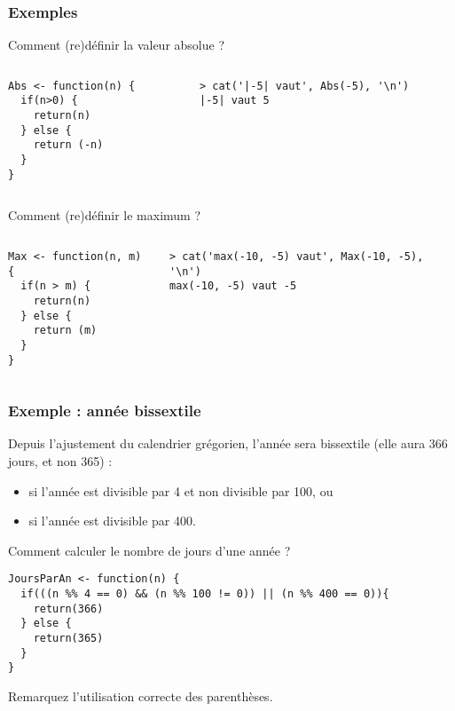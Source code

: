 \documentclass[10pt]{beamer}
\begin{document}
\begin{frame}[fragile]
  \frametitle{Exemples}

  \begin{exampleblock}{Comment (re)définir la valeur absolue ?}
\begin{columns}[c]
\begin{column}{0.4\textwidth}
  \begin{lstlisting}[style=edblock]
Abs <- function(n) {
  if(n>0) {
    return(n)
  } else {
    return (-n)
  }
}
\end{lstlisting}
\end{column}
\begin{column}{0.6\textwidth}
  \begin{lstlisting}
> cat('|-5| vaut', Abs(-5), '\n')
|-5| vaut 5    
  \end{lstlisting}
\end{column}
\end{columns}
\end{exampleblock}

  \begin{exampleblock}{Comment (re)définir le maximum ?}
\begin{columns}[c]
\begin{column}{0.4\textwidth}
  \begin{lstlisting}[style=edblock]
Max <- function(n, m) {
  if(n > m) {
    return(n)
  } else {
    return (m)
  }
}
\end{lstlisting}
\end{column}
\begin{column}{0.6\textwidth}
  \begin{lstlisting}
> cat('max(-10, -5) vaut', Max(-10, -5), '\n')
max(-10, -5) vaut -5    
\end{lstlisting}
\end{column}
\end{columns}
  \end{exampleblock}


\end{frame}

\begin{frame}[fragile]
  \frametitle{Exemple : année bissextile}
  Depuis l'ajustement du calendrier grégorien, l'année sera bissextile (elle aura 366 jours, et non 365) :
  \begin{itemize}
  \item si l'année est divisible par 4 et non divisible par 100, ou
  \item si l'année est divisible par 400.
  \end{itemize}
  \begin{exampleblock}{Comment calculer le nombre de jours d'une année  ?}
    
 
  \begin{lstlisting}[style=edblock]
JoursParAn <- function(n) {
  if(((n %% 4 == 0) && (n %% 100 != 0)) || (n %% 400 == 0)){
    return(366)
  } else {
    return(365)
  }
}
\end{lstlisting}
Remarquez l'utilisation correcte des parenthèses.
\end{exampleblock}
\end{frame}
\end{document}
